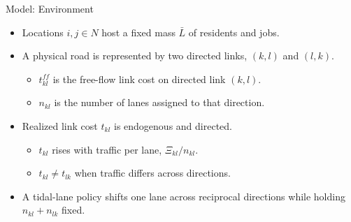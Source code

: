 \documentclass[11pt,aspectratio=169]{beamer}
\begin{document}
\begin{frame}{Model: Environment}
\begin{itemize}\small
  \item Locations $i,j\in N$ host a fixed mass $\bar L$ of residents and jobs.
  \item A physical road is represented by two directed links, $(k,l)$ and $(l,k)$.
  \begin{itemize}\footnotesize
    \item $t_{kl}^{ff}$ is the free-flow link cost on directed link $(k,l)$.
    \item $n_{kl}$ is the number of lanes assigned to that direction.
  \end{itemize}
  \item Realized link cost $t_{kl}$ is endogenous and directed.
  \begin{itemize}\footnotesize
    \item $t_{kl}$ rises with traffic per lane, $\Xi_{kl}/n_{kl}$.
    \item $t_{kl}\neq t_{lk}$ when traffic differs across directions.
  \end{itemize}
  \item A tidal-lane policy shifts one lane across reciprocal directions while holding $n_{kl}+n_{lk}$ fixed.
\end{itemize}
\end{frame}
\end{document}

